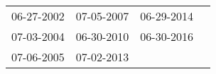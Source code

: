 \begin{supertabular}{llll}
 06-27-2002 &  07-05-2007 &  06-29-2014 \\
 07-03-2004 &  06-30-2010 &  06-30-2016 \\
 07-06-2005 &  07-02-2013 &             \\
\end{supertabular}

